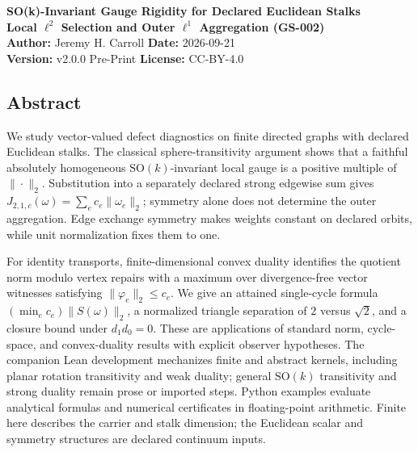 \documentclass[
  11pt,
]{article}
\date{2026-09-21}
\begin{document}
\begin{center}
{\LARGE \textbf{SO(k)-Invariant Gauge Rigidity for Declared Euclidean Stalks}}\\[0.4em]
{\large \textbf{Local \(\ell^2\) Selection and Outer \(\ell^1\) Aggregation (GS-002)}}\\[1em]
\textbf{Author:} Jeremy H. Carroll \quad \textbf{Date:} 2026-09-21\\[0.4em]
\textbf{Version:} v2.0.0 Pre-Print \quad \textbf{License:} CC-BY-4.0
\end{center}
\vspace{1em}

\subsection{Abstract}\label{abstract}

We study vector-valued defect diagnostics on finite directed graphs with
declared Euclidean stalks. The classical sphere-transitivity argument
shows that a faithful absolutely homogeneous
\(\mathrm{SO}(k)\)-invariant local gauge is a positive multiple of
\(\|\cdot\|_2\). Substitution into a separately declared strong edgewise
sum gives \(J_{2,1,c}(\omega)=\sum_e c_e\|\omega_e\|_2\); symmetry alone
does not determine the outer aggregation. Edge exchange symmetry makes
weights constant on declared orbits, while unit normalization fixes them
to one.

For identity transports, finite-dimensional convex duality identifies
the quotient norm modulo vertex repairs with a maximum over
divergence-free vector witnesses satisfying \(\|\varphi_e\|_2\le c_e\).
We give an attained single-cycle formula
\((\min_e c_e)\|S(\omega)\|_2\), a normalized triangle separation of
\(2\) versus \(\sqrt2\), and a closure bound under \(d_1d_0=0\). These
are applications of standard norm, cycle-space, and convex-duality
results with explicit observer hypotheses. The companion Lean
development mechanizes finite and abstract kernels, including planar
rotation transitivity and weak duality; general \(\mathrm{SO}(k)\)
transitivity and strong duality remain prose or imported steps. Python
examples evaluate analytical formulas and numerical certificates in
floating-point arithmetic. Finite here describes the carrier and stalk
dimension; the Euclidean scalar and symmetry structures are declared
continuum inputs.
\end{document}
